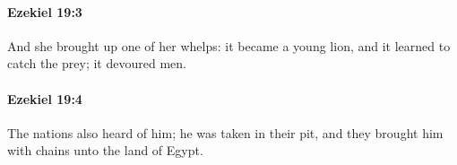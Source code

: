 		\paragraph{Ezekiel 19:3} %
			\label{EZEKIEL-19-3}

			And she brought up one of her whelps: it became a young lion, and it learned to catch the prey; it devoured men.


		\paragraph{Ezekiel 19:4} %
			\label{EZEKIEL-19-4}

			The nations also heard of him; he was taken in their pit, and they brought him with chains unto the land of Egypt.


